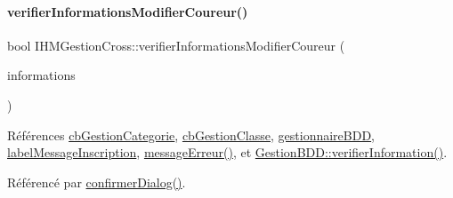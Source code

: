 \paragraph{\texorpdfstring{verifier\+Informations\+Modifier\+Coureur()}{verifierInformationsModifierCoureur()}}
{\footnotesize\ttfamily bool I\+H\+M\+Gestion\+Cross\+::verifier\+Informations\+Modifier\+Coureur (\begin{DoxyParamCaption}\item[{Q\+String\+List}]{informations }\end{DoxyParamCaption})\hspace{0.3cm}{\ttfamily [private]}}



Références \hyperlink{class_i_h_m_gestion_cross_a60cdc44c61bcd4e1e189c8de5556b89e}{cb\+Gestion\+Categorie}, \hyperlink{class_i_h_m_gestion_cross_af734c4b13942dd83fbbd0355e3728c9f}{cb\+Gestion\+Classe}, \hyperlink{class_i_h_m_gestion_cross_a440bac63a3e51db3e2c08e883f8cafc9}{gestionnaire\+B\+DD}, \hyperlink{class_i_h_m_gestion_cross_a1855bd63290c39c20660064b41710e8c}{label\+Message\+Inscription}, \hyperlink{class_i_h_m_gestion_cross_a92fa6016b00d2d4429c901e77d37bf10}{message\+Erreur()}, et \hyperlink{class_gestion_b_d_d_abfd3cfb9553a83aafd86c3149869d6c0}{Gestion\+B\+D\+D\+::verifier\+Information()}.



Référencé par \hyperlink{class_i_h_m_gestion_cross_a144933ab31ae263be7267b93bfd53a82}{confirmer\+Dialog()}.


